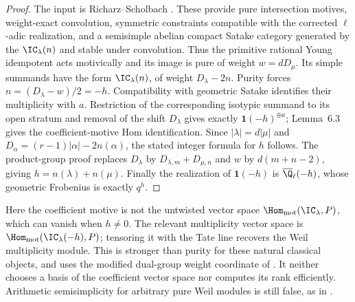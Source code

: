 \begin{proof}
The input is Richarz--Scholbach \cite[Theorem~4.1; Proposition~4.8;
Proposition~5.9; Definition~6.2; Lemma~6.3; Corollary~6.4;
Lemma~6.5]{RS}. These provide pure intersection motives, weight-exact
convolution, symmetric constraints compatible with the corrected
\(\ell\)-adic realization, and a semisimple abelian compact Satake
category generated by the $\IC_\lambda(n)$ and stable under convolution.
Thus the primitive rational Young idempotent acts motivically and its
image is pure of weight $w=dD_\mu$. Its simple summands have the form
$\IC_\lambda(n)$, of weight $D_\lambda-2n$. Purity forces
$n=(D_\lambda-w)/2=-h$. Compatibility with geometric Satake identifies
their multiplicity with $a$. Restriction of the corresponding isotypic
summand to its open stratum and removal of the shift $D_\lambda$ gives
exactly $\mathbf1(-h)^{\oplus a}$; Lemma~6.3 gives the coefficient-motive
Hom identification. Since $|\lambda|=d|\mu|$ and
$D_\alpha=(r-1)|\alpha|-2n(\alpha)$, the stated integer formula for
$h$ follows. The product-group proof replaces $D_\lambda$ by
$D_{\lambda,m}+D_{\mu,n}$ and $w$ by $d(m+n-2)$, giving
$h=n(\lambda)+n(\mu)$. Finally the realization of $\mathbf1(-h)$ is
$\overline\Q_\ell(-h)$, whose geometric Frobenius is exactly $q^h$.
\end{proof}
Here the coefficient motive is not the untwisted vector space
$\Hom_{\rm mot}(\IC_\lambda,P)$, which can vanish when $h\ne0$.
The relevant multiplicity vector space is
$\Hom_{\rm mot}(\IC_\lambda(-h),P)$; tensoring it with the Tate line
recovers the Weil multiplicity module. This is stronger than purity for
these natural classical objects, and uses the modified dual-group
weight coordinate of \cite[Theorem~6.8]{RS}. It neither chooses a basis
of the coefficient vector space nor computes its rank efficiently.
Arithmetic semisimplicity for arbitrary pure Weil modules is still
false, as in .
